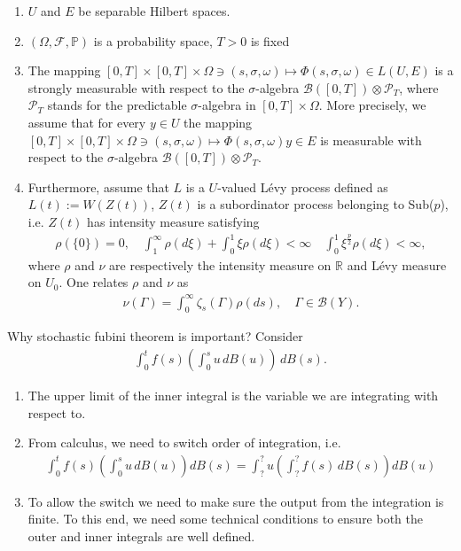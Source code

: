 \documentclass[xcolor=dvipsnames,leqno]{beamer}
\newcommand{\R}{\mathbb{R}}
\renewcommand{\P}{\mathbb{P}}
\begin{document}
\begin{frame}
\begin{enumerate}
	\item $U$  and $E$ be separable Hilbert spaces.
	\item $(\Omega,\mathcal{F},\P)$ is a probability space, $T>0$ is fixed
	\item The mapping $[0,T]\times[0,T]\times\Omega\ni (s,\sigma,\omega)\mapsto \Phi(s,\sigma,\omega)\in L(U,E)$ is a strongly measurable with respect to the $\sigma$-algebra $\mathcal B([0,T])\otimes\mathcal P_T$, where $\mathcal P_T$ stands for the predictable $\sigma$-algebra in $[0,T]\times\Omega$. More precisely, we assume that for every $y\in U$ the mapping $[0,T]\times[0,T]\times\Omega\ni (s,\sigma,\omega)\mapsto \Phi(s,\sigma,\omega)y\in E$ is measurable with respect to the $\sigma$-algebra $\mathcal B([0,T])\otimes\mathcal P_T$. 
	\item Furthermore, assume that $L$ is a $U$-valued L\'evy process defined as $L(t):=W(Z(t))$, $Z(t)$ is a subordinator process belonging to Sub($p$), i.e. $Z(t)$ has intensity measure satisfying
	\begin{align*}
	\rho(\{0\})=0,\quad\int_1^{\infty}\rho(d\xi)+\int_0^1\xi\rho(d\xi)<\infty\quad	\int_0^1\xi^{\frac{p}{2}}\rho(d\xi)<\infty,
	\end{align*}
	where $\rho$ and $\nu$ are respectively the intensity measure on $\R$ and L\'evy measure on $U_0$. One relates $\rho$ and $\nu$ as
	\begin{align*}
	\nu(\Gamma)=\int_0^{\infty}\zeta_s(\Gamma)\rho(ds),\quad\Gamma\in\mathcal{B}(Y).
	\end{align*}
\end{enumerate}

\end{frame}

\begin{frame}{Why stochastic fubini theorem is important?}
	Consider
	\begin{align*}
	\int^t_0 f(s)\left(\int^s_0 u\,d B(u)\right)\,dB(s).
	\end{align*}
\begin{enumerate}
	\item The upper limit of the inner integral is the variable we are integrating with respect to.
	\item From calculus, we need to switch order of integration, i.e.
	\begin{align*}
		\int^t_0 f(s)\left(\int^s_0 u\,dB(u)\right)dB(s)=\int^{?}_{?} u\left(\int^{?}_{?} f(s) \,dB(s)\right)dB(u)
	\end{align*}
	\item To allow the switch we need to make sure the output from the integration is finite. To this end, we need some technical conditions to ensure both the outer and inner integrals are well defined.
\end{enumerate}
\end{frame}
\end{document}
